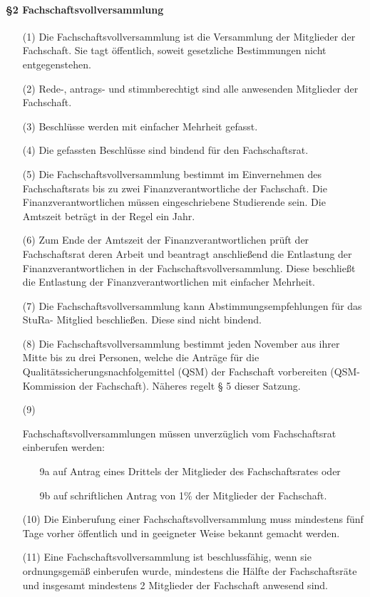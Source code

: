     \paragraph{§2 Fachschaftsvollversammlung}
    \begin{enumerate}
        \item[(1)] {Die Fachschaftsvollversammlung ist die Versammlung der Mitglieder der        Fachschaft.  Sie tagt öffentlich, soweit gesetzliche Bestimmungen nicht        entgegenstehen.}
        \item[(2)] {Rede-, antrags- und stimmberechtigt sind alle anwesenden Mitglieder der        Fachschaft.}
        \item[(3)] {Beschlüsse werden mit einfacher Mehrheit gefasst.}
        \item[(4)] {Die gefassten Beschlüsse sind bindend für den Fachschaftsrat.}
        \item[(5)] {Die Fachschaftsvollversammlung bestimmt im Einvernehmen des Fachschaftsrats bis        zu zwei Finanzverantwortliche der Fachschaft. Die Finanzverantwortlichen müssen        eingeschriebene Studierende sein. Die Amtszeit beträgt in der Regel ein Jahr.}
        \item[(6)] {Zum Ende der Amtszeit der Finanzverantwortlichen prüft der Fachschaftsrat deren        Arbeit und beantragt anschließend die Entlastung der Finanzverantwortlichen in der        Fachschaftsvollversammlung. Diese beschließt die Entlastung der        Finanzverantwortlichen mit einfacher Mehrheit.}
        \item[(7)] {Die Fachschaftsvollversammlung kann Abstimmungsempfehlungen für das StuRa-        Mitglied beschließen. Diese sind nicht bindend.}
        \item[(8)] {Die Fachschaftsvollversammlung bestimmt jeden November aus ihrer Mitte bis zu        drei Personen, welche die Anträge für die Qualitätssicherungsnachfolgemittel (QSM)        der Fachschaft vorbereiten (QSM-Kommission der Fachschaft). Näheres regelt § 5 dieser        Satzung.}
        \item[(9)] {Fachschaftsvollversammlungen müssen unverzüglich vom Fachschaftsrat einberufen        werden:
            \begin{enumerate}
                \item[9a]auf Antrag eines Drittels der Mitglieder des Fachschaftsrates oder
                \item[9b]auf schriftlichen Antrag von 1\% der Mitglieder der Fachschaft.
            \end{enumerate}
        }
        \item[(10)]{Die Einberufung einer Fachschaftsvollversammlung muss mindestens fünf Tage        vorher öffentlich und in geeigneter Weise bekannt gemacht werden.}
        \item[(11)]{Eine Fachschaftsvollversammlung ist beschlussfähig, wenn sie ordnungsgemäß        einberufen wurde, mindestens die Hälfte der Fachschaftsräte und insgesamt mindestens        2 Mitglieder der Fachschaft anwesend sind.} 
    \end{enumerate}
